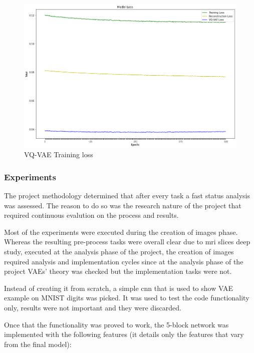 \begin{figure}[ht]
    \includegraphics[width = 17cm]{images/vqvae-loss-results.png}
    \caption[VQ-VAE Training loss]{VQ-VAE Training loss}
    \label{fig:vqvae-training-loss}
\end{figure}


\FloatBarrier

\subsubsection{Experiments}

The project methodology determined that after every task a fast status analysis was assessed. The reason to do so was the research nature of the project that required continuous evalution on the process and results.

Most of the experiments were executed during the creation of images phase. Whereas the resulting pre-process tasks were overall clear due to  \acrshort{mri} slices deep study, executed at the analysis phase of the project, the creation of images required analysis and implementation cycles since at the analysis phase of the project VAEs' theory was checked but the implementation tasks were not.

Instead of creating it from scratch, a simple \acrfull{cnn} that is used to show VAE example on MNIST \cite{mnist} digits was picked. It was used to test the code functionality only, results were not important and they were discarded. 

Once that the functionality was proved to work, the 5-block network was implemented with the following features (it details only the features that vary from the final model):

